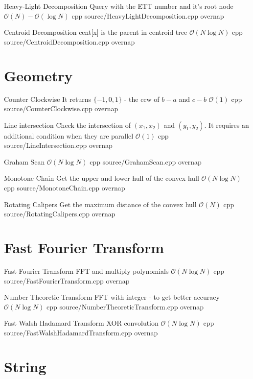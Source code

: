 \documentclass[landscape, 10pt, a4paper, oneside, twocolumn]{extarticle}
\begin{document}
\Algorithm
{Heavy-Light Decomposition}
{Query with the ETT number and it's root node}
{$\mathcal{O}(N)-\mathcal{O}(\log{N})$}
{cpp}
{source/HeavyLightDecomposition.cpp}
{overnap}

\Algorithm
{Centroid Decomposition}
{cent[x] is the parent in centroid tree}
{$\mathcal{O}(N\log{N})$}
{cpp}
{source/CentroidDecomposition.cpp}
{overnap}


\section{Geometry}

\Algorithm
{Counter Clockwise}
{It returns $\{-1, 0, 1\}$ - the ccw of $b-a$ and $c-b$}
{$\mathcal{O}(1)$}
{cpp}
{source/CounterClockwise.cpp}
{overnap}

\Algorithm
{Line intersection}
{Check the intersection of $(x_1, x_2)$ and $(y_1, y_2)$. It requires an additional condition when they are parallel}
{$\mathcal{O}(1)$}
{cpp}
{source/LineIntersection.cpp}
{overnap}

\Algorithm
{Graham Scan}
{}
{$\mathcal{O}(N\log{N})$}
{cpp}
{source/GrahamScan.cpp}
{overnap}

\Algorithm
{Monotone Chain}
{Get the upper and lower hull of the convex hull}
{$\mathcal{O}(N\log{N})$}
{cpp}
{source/MonotoneChain.cpp}
{overnap}

\Algorithm
{Rotating Calipers}
{Get the maximum distance of the convex hull}
{$\mathcal{O}(N)$}
{cpp}
{source/RotatingCalipers.cpp}
{overnap}


\section{Fast Fourier Transform}

\Algorithm
{Fast Fourier Transform}
{FFT and multiply polynomials}
{$\mathcal{O}(N\log{N})$}
{cpp}
{source/FastFourierTransform.cpp}
{overnap}

\Algorithm
{Number Theoretic Transform}
{FFT with integer - to get better accuracy}
{$\mathcal{O}(N\log{N})$}
{cpp}
{source/NumberTheoreticTransform.cpp}
{overnap}

\Algorithm
{Fast Walsh Hadamard Transform}
{XOR convolution}
{$\mathcal{O}(N\log{N})$}
{cpp}
{source/FastWalshHadamardTransform.cpp}
{overnap}


\section{String}
\end{document}
